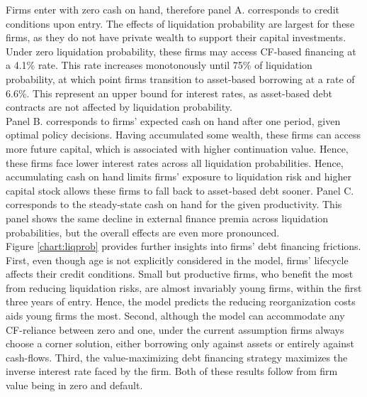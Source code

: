 \documentclass[12pt]{article}
\begin{document}
\noindent Firms enter with zero cash on hand, therefore panel A. corresponds to credit conditions upon entry. The effects of liquidation probability are largest for these firms, as they do not have private wealth to support their capital investments. Under zero liquidation probability, these firms may access CF-based financing at a 4.1\% rate. This rate increases monotonously until 75\% of liquidation probability, at which point firms transition to asset-based borrowing at a rate of 6.6\%. This represent an upper bound for interest rates, as asset-based debt contracts are not affected by liquidation probability. \vspace{3mm} \\
Panel B. corresponds to firms' expected cash on hand after one period, given optimal policy decisions. Having accumulated some wealth, these firms can access more future capital, which is associated with higher continuation value. Hence, these firms face lower interest rates across all liquidation probabilities. Hence, accumulating cash on hand limits firms' exposure to liquidation risk and higher capital stock allows these firms to fall back to asset-based debt sooner. Panel C. corresponds to the steady-state cash on hand for the given productivity. This panel shows the same decline in external finance premia across liquidation probabilities, but the overall effects are even more pronounced. \vspace{3mm} \\
Figure \ref{chart:liqprob} provides further insights into firms' debt financing frictions. First, even though age is not explicitly considered in the model, firms' lifecycle affects their credit conditions. Small but productive firms, who benefit the most from reducing liquidation risks, are almost invariably young firms, within the first three years of entry. Hence, the model predicts the reducing reorganization costs aids young firms the most. Second, although the model can accommodate any CF-reliance between zero and one, under the current assumption firms always choose a corner solution, either borrowing only against assets or entirely against cash-flows. Third, the value-maximizing debt financing strategy maximizes the inverse interest rate faced by the firm. Both of these results follow from firm value being in zero and default. 
\end{document}
